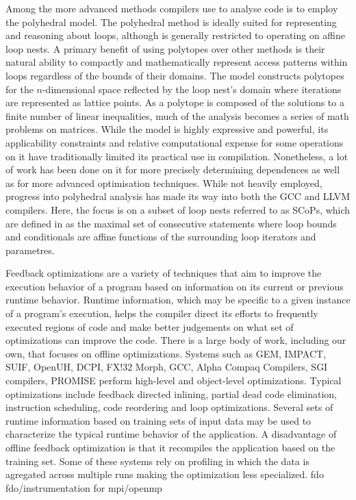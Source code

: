 Among the more advanced methods compilers use to analyse code is to employ the polyhedral model\cite{Cousot:1978:ADL:512760.512770}\cite{Bagnara:2009:APC:1628316.1628385}\cite{benabderrahmane.10.cc}.
The polyhedral method is ideally suited for representing and reasoning about loops, although is generally restricted to operating on affine loop nests.
A primary benefit of using polytopes over other methods is their natural ability to compactly and mathematically represent access patterns within loops regardless of the bounds of their domains.
The model constructs polytopes for the $n$-dimensional space reflected by the loop nest's domain where iterations are represented as lattice points.
As a polytope is composed of the solutions to a finite number of linear inequalities, much of the analysis becomes a series of math problems on matrices.
While the model is highly expressive and powerful, its applicability constraints and relative computational expense for some operations on it have traditionally limited its practical use in compilation\cite{DBLP:journals/entcs/Simon10a}.
Nonetheless, a lot of work has been done on it for more precisely determining dependences\cite{Vasilache:2006:VDA:1183401.1183448} as well as for more advanced optimisation techniques\cite{Nieuwenhuizen2014AutovectorizationUP}\cite{5260526}.
While not heavily employed, progress into polyhedral analysis has made its way into both the \ac{GCC}\cite{trifunovic:inria-00551516} and LLVM\cite{grosser.11.impact} compilers.
Here, the focus is on a subset of loop nests referred to as \acp{SCoP}\cite{TBas}, which are defined in \cite{benabderrahmane.10.cc} as the maximal set of consecutive statements where loop bounds and conditionals are affine functions of the surrounding loop iterators and parametres.

Feedback optimizations are a variety  of techniques that aim to improve
the execution behavior of a program based on information on its current or
previous runtime behavior. Runtime
information, which may be specific to a given instance of a program's
execution, helps the compiler direct its efforts to frequently
executed regions of code and make better judgements on what set of
optimizations can  improve the code.  There is a large body of work, including
our own, that  focuses on offline optimizations. Systems such as GEM,
IMPACT, SUIF, OpenUH, DCPI, FX!32 Morph, GCC, Alpha Compaq Compilers, SGI compilers, PROMISE
perform high-level and object-level optimizations. Typical optimizations include
feedback directed inlining, partial dead code elimination,
instruction scheduling, code reordering and loop optimizations.
Several sets of  runtime information based on training sets of input data may be used to characterize the typical runtime behavior of the application.
A disadvantage of offline feedback optimization is that it recompiles the application based on the training set. Some of these
systems rely on profiling in which the data is agregated across multiple runs making the optimization
less specialized.
fdo\cite{Smith:2000:OCF:351403.351408}
fdo/instrumentation for mpi/openmp\cite{10.1007/978-3-540-68555-5_22}


